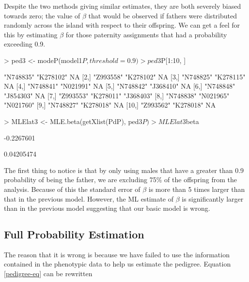 \documentclass{article}
\begin{document}
Despite the two methods giving similar estimates, they are both severely biased towards zero; the value of $\beta$ that would be observed if fathers were distributed randomly across the island with respect to their offspring.  We can get a feel for this by estimating $\beta$ for those paternity assignments that had a probability exceeding 0.9.   

\begin{Schunk}
\begin{Sinput}
> ped3 <- modeP(model1$P, threshold = 0.9)
> ped3$P[1:10, ]
\end{Sinput}
\begin{Soutput}
      [,1]      [,2]      [,3]     
 [1,] "N748835" "K278102" NA       
 [2,] "Z993558" "K278102" NA       
 [3,] "N748825" "K278115" NA       
 [4,] "N748841" "N021991" NA       
 [5,] "N748842" "J368410" NA       
 [6,] "N748848" "J854303" NA       
 [7,] "Z993553" "K278011" "J368403"
 [8,] "N748838" "N021965" "N021760"
 [9,] "N748827" "K278018" NA       
[10,] "Z993562" "K278018" NA       
\end{Soutput}
\begin{Sinput}
> MLElat3 <- MLE.beta(getXlist(PdP), ped3$P)
> MLElat3$beta
\end{Sinput}
\begin{Soutput}
           [,1]
[1,] -0.2267601
\end{Soutput}
\begin{Soutput}
           [,1]
[1,] 0.04205474
\end{Soutput}
\end{Schunk}

The first thing to notice is that by only using males that have a greater than 0.9 probability of being the father, we are excluding 75\% of the offspring from the analysis. Because of this the standard error of $\beta$ is more than 5 times larger than that in the previous model.  However, the ML estimate of $\beta$ is significantly larger than in the previous model suggesting that our basic model is wrong. 


\subsection{Full Probability Estimation}
\label{fp-sec}

 The reason that it is wrong is because we have failed to use the information contained in the phenotypic data to help us estimate the pedigree.  Equation \ref{pedigree-eq} can be rewritten
\end{document}
